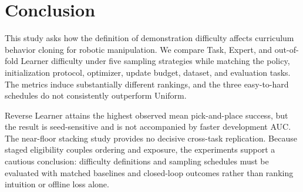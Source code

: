 \section{Conclusion}
\label{sec:conclusion}

This study asks how the definition of demonstration difficulty affects
curriculum behavior cloning for robotic manipulation. We compare Task, Expert,
and out-of-fold Learner difficulty under five sampling strategies while
matching the policy, initialization protocol, optimizer, update budget,
dataset, and evaluation tasks. The metrics induce substantially different
rankings, and the three easy-to-hard schedules do not consistently outperform
Uniform.

Reverse Learner attains the highest observed mean pick-and-place success, but
the result is seed-sensitive and is not accompanied by faster development AUC.
The near-floor stacking study provides no decisive cross-task replication.
Because staged eligibility couples ordering and exposure, the experiments
support a cautious conclusion: difficulty definitions and sampling schedules
must be evaluated with matched baselines and closed-loop outcomes rather than
ranking intuition or offline loss alone.
